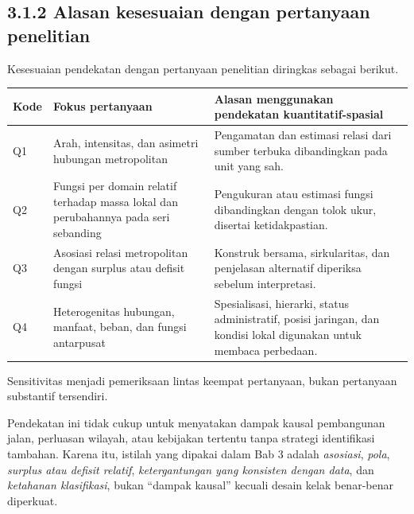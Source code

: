 \documentclass[
  indonesian,
  11pt,
  a4paper,
  oneside,
  openany]{report}
\newcounter{none} %
\begin{document}
\subsection{3.1.2 Alasan kesesuaian dengan pertanyaan
penelitian}\label{alasan-kesesuaian-dengan-pertanyaan-penelitian}

Kesesuaian pendekatan dengan pertanyaan penelitian diringkas sebagai
berikut.

{\def\LTcaptype{none} %
\begin{longtable}[]{@{}
  >{\raggedright\arraybackslash}p{}
  >{\raggedright\arraybackslash}p{}
  >{\raggedright\arraybackslash}p{}@{}}
\toprule\noalign{}
\begin{minipage}[b]{\linewidth}\raggedright
Kode
\end{minipage} & \begin{minipage}[b]{\linewidth}\raggedright
Fokus pertanyaan
\end{minipage} & \begin{minipage}[b]{\linewidth}\raggedright
Alasan menggunakan pendekatan kuantitatif-spasial
\end{minipage} \\
\midrule\noalign{}
\endhead
\bottomrule\noalign{}
\endlastfoot
Q1 & Arah, intensitas, dan asimetri hubungan metropolitan & Pengamatan
dan estimasi relasi dari sumber terbuka dibandingkan pada unit yang
sah. \\
Q2 & Fungsi per domain relatif terhadap massa lokal dan perubahannya
pada seri sebanding & Pengukuran atau estimasi fungsi dibandingkan
dengan tolok ukur, disertai ketidakpastian. \\
Q3 & Asosiasi relasi metropolitan dengan surplus atau defisit fungsi &
Konstruk bersama, sirkularitas, dan penjelasan alternatif diperiksa
sebelum interpretasi. \\
Q4 & Heterogenitas hubungan, manfaat, beban, dan fungsi antarpusat &
Spesialisasi, hierarki, status administratif, posisi jaringan, dan
kondisi lokal digunakan untuk membaca perbedaan. \\
\end{longtable}
}

Sensitivitas menjadi pemeriksaan lintas keempat pertanyaan, bukan
pertanyaan substantif tersendiri.

Pendekatan ini tidak cukup untuk menyatakan dampak kausal pembangunan
jalan, perluasan wilayah, atau kebijakan tertentu tanpa strategi
identifikasi tambahan. Karena itu, istilah yang dipakai dalam Bab 3
adalah \emph{asosiasi}, \emph{pola}, \emph{surplus atau defisit
relatif}, \emph{ketergantungan yang konsisten dengan data}, dan
\emph{ketahanan klasifikasi}, bukan ``dampak kausal'' kecuali desain
kelak benar-benar diperkuat.
\end{document}
